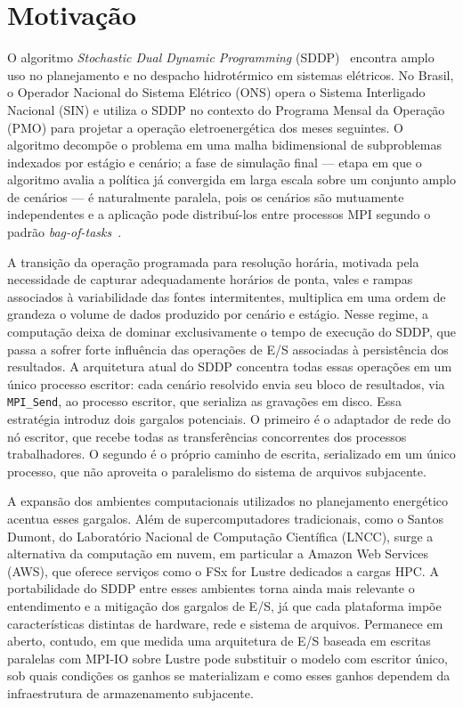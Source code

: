 \section{Motivação}

O algoritmo \textit{Stochastic Dual Dynamic Programming}
(SDDP)~\cite{MvLm:91} encontra amplo uso no planejamento e no
despacho hidrotérmico em sistemas elétricos. No Brasil, o Operador
Nacional do Sistema Elétrico (ONS) opera o Sistema Interligado Nacional
(SIN) e utiliza o SDDP no contexto do Programa Mensal da Operação (PMO)
para projetar a operação eletroenergética dos meses seguintes. O algoritmo decompõe o problema em uma malha
bidimensional de subproblemas indexados por estágio e cenário; a
fase de simulação final --- etapa em que o algoritmo avalia a política já convergida em larga
escala sobre um conjunto amplo de cenários ---
é naturalmente paralela, pois os cenários são mutuamente
independentes e a aplicação pode distribuí-los entre processos MPI segundo
o padrão \textit{bag-of-tasks}~\cite{Cirne:2003}.

A transição da operação programada para resolução horária,
motivada pela necessidade de capturar adequadamente horários de
ponta, vales e rampas associados à variabilidade das fontes
intermitentes, multiplica em uma ordem de grandeza o volume de
dados produzido por cenário e estágio. Nesse regime, a
computação deixa de dominar exclusivamente o tempo de execução do SDDP,
que passa a sofrer forte influência das operações de E/S associadas à
persistência dos resultados. A arquitetura
atual do SDDP concentra todas essas operações em um único
processo escritor: cada cenário resolvido envia seu bloco de
resultados, via \texttt{MPI\_Send}, ao processo escritor,
que serializa as gravações em disco. Essa estratégia introduz dois
gargalos potenciais. O primeiro é o adaptador de rede do nó
escritor, que recebe todas as transferências concorrentes dos
processos trabalhadores. O segundo é o próprio caminho de escrita,
serializado em um único processo, que não aproveita o paralelismo
do sistema de arquivos subjacente.

A expansão dos ambientes computacionais utilizados no planejamento
energético acentua esses gargalos. Além de
supercomputadores tradicionais, como o Santos Dumont, do
Laboratório Nacional de Computação Científica (LNCC), surge a
alternativa da computação em nuvem, em particular a Amazon Web
Services (AWS), que oferece serviços como o FSx for Lustre
dedicados a cargas HPC. A portabilidade do SDDP entre esses
ambientes torna ainda mais relevante o entendimento e a mitigação
dos gargalos de E/S, já que cada plataforma impõe características
distintas de hardware, rede e sistema de arquivos. Permanece em
aberto, contudo, em que medida uma arquitetura de E/S baseada em
escritas paralelas com MPI-IO sobre Lustre pode substituir o
modelo com escritor único, sob quais condições os ganhos se
materializam e como esses ganhos dependem da infraestrutura de
armazenamento subjacente.

